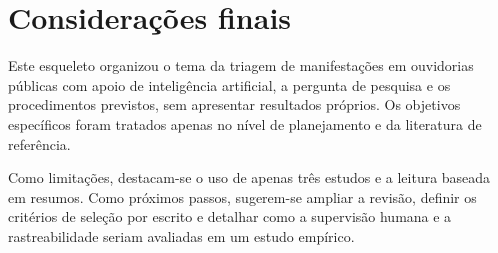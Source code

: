 
\section{Considerações finais}

Este esqueleto organizou o tema da triagem de manifestações em ouvidorias públicas com apoio de inteligência artificial, a pergunta de pesquisa e os procedimentos previstos, sem apresentar resultados próprios. Os objetivos específicos foram tratados apenas no nível de planejamento e da literatura de referência.

Como limitações, destacam-se o uso de apenas três estudos e a leitura baseada em resumos. Como próximos passos, sugerem-se ampliar a revisão, definir os critérios de seleção por escrito e detalhar como a supervisão humana e a rastreabilidade seriam avaliadas em um estudo empírico.
